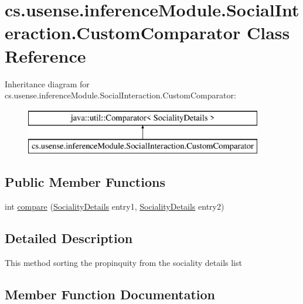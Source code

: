 \hypertarget{classcs_1_1usense_1_1inference_module_1_1_social_interaction_1_1_custom_comparator}{}\section{cs.\+usense.\+inference\+Module.\+Social\+Interaction.\+Custom\+Comparator Class Reference}
\label{classcs_1_1usense_1_1inference_module_1_1_social_interaction_1_1_custom_comparator}
Inheritance diagram for cs.\+usense.\+inference\+Module.\+Social\+Interaction.\+Custom\+Comparator\+:\begin{figure}[H]
\begin{center}
\leavevmode
\includegraphics[height=2.000000cm]{classcs_1_1usense_1_1inference_module_1_1_social_interaction_1_1_custom_comparator}
\end{center}
\end{figure}
\subsection*{Public Member Functions}
\begin{DoxyCompactItemize}
\item 
int \hyperlink{classcs_1_1usense_1_1inference_module_1_1_social_interaction_1_1_custom_comparator_af43d8dec56bf743d8af500dca628c333}{compare} (\hyperlink{classcs_1_1usense_1_1inference_module_1_1_sociality_details}{Sociality\+Details} entry1, \hyperlink{classcs_1_1usense_1_1inference_module_1_1_sociality_details}{Sociality\+Details} entry2)
\end{DoxyCompactItemize}


\subsection{Detailed Description}
This method sorting the propinquity from the sociality details list 

\subsection{Member Function Documentation}
\hypertarget{classcs_1_1usense_1_1inference_module_1_1_social_interaction_1_1_custom_comparator_af43d8dec56bf743d8af500dca628c333}{}
